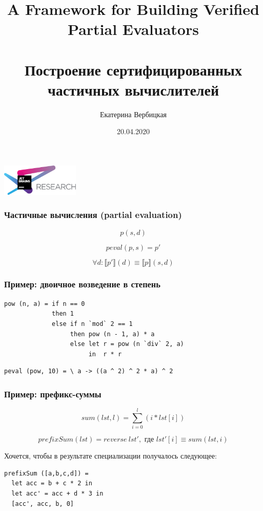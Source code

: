 \documentclass[xcolor=table]{beamer}
\title[]{A Framework for Building Verified Partial Evaluators\\~\\Построение сертифицированных частичных вычислителей}
\institute[]{
Лаборатория языковых инструментов JetBrains
}
\author[Екатерина Вербицкая]{Екатерина Вербицкая}
\date{20.04.2020}
\begin{document}
{
\begin{frame}[fragile]
   \begin{center}
      \includegraphics[height=1.5cm]{pictures/jetbrainsResearch.pdf}
    \end{center}
  \titlepage
\end{frame}
}

\begin{frame}[fragile]
  \transwipe[direction=90]
  \frametitle{Частичные вычисления (partial evaluation)}
\[p(s,d)\]

\[peval(p, s) = p'\]

\[\forall d: \llbracket p'\rrbracket (d) \equiv \llbracket p \rrbracket (s, d) \]
\end{frame}

\begin{frame}[fragile]
  \transwipe[direction=90]
  \frametitle{Пример: двоичное возведение в степень}

\begin{lstlisting}
pow (n, a) = if n == 0
             then 1
             else if n `mod` 2 == 1
                  then pow (n - 1, a) * a
                  else let r = pow (n `div` 2, a)
                       in  r * r
\end{lstlisting}

\begin{lstlisting}
peval (pow, 10) = \ a -> ((a ^ 2) ^ 2 * a) ^ 2
\end{lstlisting}

\end{frame}

\begin{frame}[fragile]
  \transwipe[direction=90]
  \frametitle{Пример: префикс-суммы}
\[
  sum(lst, l) = \sum_{i=0}^{l} (i * lst[i])
\]

\[
  prefixSum(lst) = reverse \ lst', \text{ где } lst'[i] \equiv sum(lst, i)
\]

\bigskip

\begin{center}
  Хочется, чтобы в результате специализации получалось следующее:
\end{center}

\bigskip

\begin{lstlisting}
prefixSum ([a,b,c,d]) =
  let acc = b + c * 2 in
  let acc' = acc + d * 3 in
  [acc', acc, b, 0]
\end{lstlisting}

\end{frame}
\end{document}
